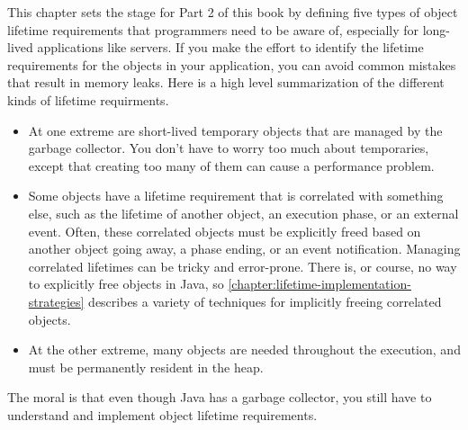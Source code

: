 This chapter sets the stage for Part 2 of this book by
defining five types of object lifetime requirements that programmers need to be
aware of, especially for long-lived applications like servers. If
you make the effort to identify the lifetime requirements for the objects in
your application, you can avoid common mistakes that result in memory leaks.
Here is a high level summarization of the different kinds of lifetime
requirments.
\begin{itemize}
  \item At one extreme are short-lived temporary objects that are managed
  by the \jre garbage collector. You don't have to worry too much about temporaries, except that
  creating too many of them can cause a performance problem.
  \item Some objects have a lifetime requirement that is correlated with 
   something else, such as the lifetime of another object, an execution phase,
   or an external event. Often, these correlated objects must be explicitly freed based on
    another object going away, a phase ending, or an event
   notification. Managing correlated lifetimes can be tricky and
   error-prone. There is, or course, no way to explicitly free
   objects in Java, so
   \autoref{chapter:lifetime-implementation-strategies}
   describes a variety of techniques for implicitly freeing
   correlated objects. 
   \item At the other extreme, many objects are needed throughout
   the execution, and must be permanently resident in the heap.
\end{itemize}
 The moral is that even though Java has a garbage collector, you still have to
 understand and implement object lifetime requirements.





